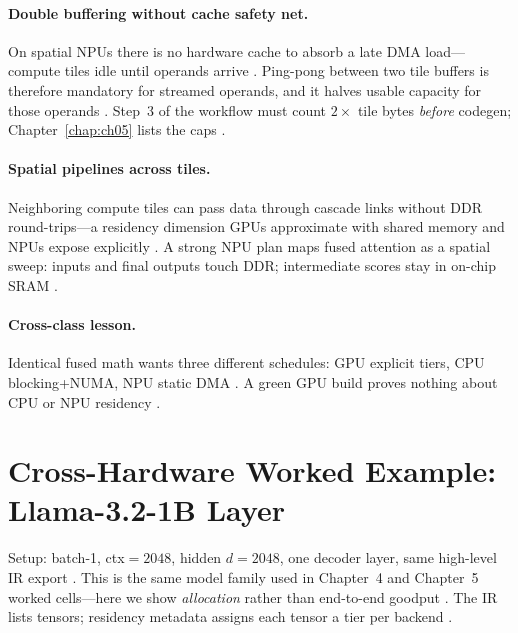 \paragraph{Double buffering without cache safety net.}
On spatial NPUs there is no hardware cache to absorb a late DMA load---compute tiles idle until operands arrive \citep{amd2024aie,amd2024xdna}.
Ping-pong between two tile buffers is therefore mandatory for streamed operands, and it halves usable capacity for those operands \citep{patel2025llminference}.
Step~3 of the workflow must count $2\times$ tile bytes \emph{before} codegen; Chapter~\ref{chap:ch05} lists the caps \citep{yirage2026,amd2024xdna}.

\paragraph{Spatial pipelines across tiles.}
Neighboring compute tiles can pass data through cascade links without DDR round-trips---a residency dimension GPUs approximate with shared memory and NPUs expose explicitly \citep{amd2024aie,dao2022flashattention}.
A strong NPU plan maps fused attention as a spatial sweep: inputs and final outputs touch DDR; intermediate scores stay in on-chip SRAM \citep{memoryfloor2026,amd2024xdna}.

\paragraph{Cross-class lesson.}
Identical fused math wants three different schedules: GPU explicit tiers, CPU blocking+NUMA, NPU static DMA \citep{chen2020compilerbasedhardw,yirage2026,patel2025llminference}.
A green GPU build proves nothing about CPU or NPU residency \citep{amd2024aie,memoryfloor2026,taxbreak2026}.

\section{Cross-Hardware Worked Example: Llama-3.2-1B Layer}
\label{sec:ch06_cross_hw_worked_example}

Setup: batch-1, ctx${=}2048$, hidden $d{=}2048$, one decoder layer, same high-level IR export \citep{taxbreak2026,kwon2023vllm,yirage2026}.
This is the same model family used in Chapter~4 and Chapter~5 worked cells---here we show \emph{allocation} rather than end-to-end goodput \citep{memoryfloor2026,taxbreak2026}.
The IR lists tensors; residency metadata assigns each tensor a tier per backend \citep{yirage2026,chen2020compilerbasedhardw}.

